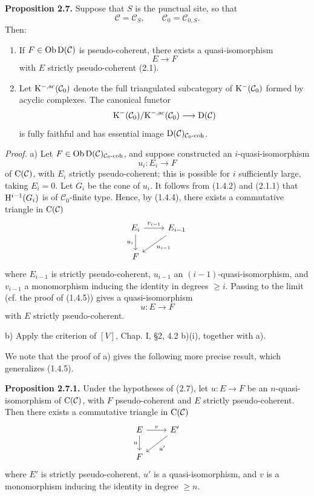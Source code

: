 \documentclass[11pt]{article}
\begin{document}
\textbf{Proposition 2.7.} Suppose that \(S\) is the punctual site, so that
\[
  \mathcal C=\mathcal C_S,\qquad \mathcal C_0=\mathcal C_{0,S}.
\]
Then:
\begin{enumerate}[label=\alph*)]
\item If \(F\in\operatorname{Ob}\mathrm D(\mathcal C)\) is pseudo-coherent, there exists a quasi-isomorphism
\[
  E\longrightarrow F
\]
with \(E\) strictly pseudo-coherent (2.1).
\item Let \(\mathrm K^{-,\mathrm{ac}}(\mathcal C_0)\) denote the full triangulated subcategory of \(\mathrm K^-(\mathcal C_0)\) formed by acyclic complexes. The canonical functor
\[
  \mathrm K^-(\mathcal C_0)/\mathrm K^{-,\mathrm{ac}}(\mathcal C_0)
  \longrightarrow \mathrm D(\mathcal C)
\]
is fully faithful and has essential image \(\mathrm D(\mathcal C)_{\mathcal C_0\text{-}\mathrm{coh}}\).
\end{enumerate}

\emph{Proof.} a) Let \(F\in\operatorname{Ob}\mathrm D(\mathcal C)_{\mathcal C_0\text{-}\mathrm{coh}}\), and suppose constructed an \(i\)-quasi-isomorphism
\[
  u_i:E_i\longrightarrow F
\]
of \(\mathrm C(\mathcal C)\), with \(E_i\) strictly pseudo-coherent; this is possible for \(i\) sufficiently large, taking \(E_i=0\). Let \(G_i\) be the cone of \(u_i\). It follows from (1.4.2) and (2.1.1) that \(\mathrm H^{i-1}(G_i)\) is of \(\mathcal C_0\)-finite type. Hence, by (1.4.4), there exists a commutative triangle in \(\mathrm C(\mathcal C)\)
\[
\begin{tikzcd}
E_i \arrow[r,"v_{i-1}"] \arrow[d,"u_i"'] & E_{i-1} \arrow[dl,"u_{i-1}"]\\
F &
\end{tikzcd}
\]
where \(E_{i-1}\) is strictly pseudo-coherent, \(u_{i-1}\) an \((i-1)\)-quasi-isomorphism, and \(v_{i-1}\) a monomorphism inducing the identity in degrees \(\geq i\). Passing to the limit (cf. the proof of (1.4.5)) gives a quasi-isomorphism
\[
  u:E\longrightarrow F
\]
with \(E\) strictly pseudo-coherent.

b) Apply the criterion of \([V]\), Chap. I, §2, 4.2 b)(i), together with a).

We note that the proof of a) gives the following more precise result, which generalizes (1.4.5).

\textbf{Proposition 2.7.1.} Under the hypotheses of (2.7), let \(u:E\to F\) be an \(n\)-quasi-isomorphism of \(\mathrm C(\mathcal C)\), with \(F\) pseudo-coherent and \(E\) strictly pseudo-coherent. Then there exists a commutative triangle in \(\mathrm C(\mathcal C)\)
\[
\begin{tikzcd}
E \arrow[r,"v"] \arrow[d,"u"'] & E' \arrow[dl,"u'"]\\
F &
\end{tikzcd}
\]
where \(E'\) is strictly pseudo-coherent, \(u'\) is a quasi-isomorphism, and \(v\) is a monomorphism inducing the identity in degree \(\geq n\).
\end{document}
